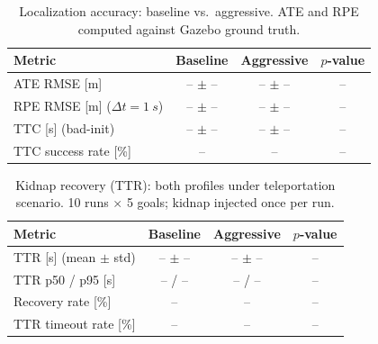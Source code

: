 \begin{table}[t]
\centering
\caption{Localization accuracy: baseline vs.\ aggressive.
ATE and RPE computed against Gazebo ground truth.}
\label{tab:localization}
\begin{tabular}{lccc}
\toprule
Metric & Baseline & Aggressive & $p$-value \\
\midrule
ATE RMSE [m]         & -- $\pm$ -- & -- $\pm$ -- & -- \\
RPE RMSE [m] ($\Delta t = \SI{1}{s}$) & -- $\pm$ -- & -- $\pm$ -- & -- \\
\midrule
TTC [s] (bad-init)   & -- $\pm$ -- & -- $\pm$ -- & -- \\
TTC success rate [\%] & --          & --          & -- \\
\bottomrule
\end{tabular}
\end{table}

\begin{table}[t]
\centering
\caption{Kidnap recovery (TTR): both profiles under teleportation scenario.
10 runs $\times$ 5 goals; kidnap injected once per run.}
\label{tab:kidnap}
\begin{tabular}{lccc}
\toprule
Metric & Baseline & Aggressive & $p$-value \\
\midrule
TTR [s] (mean $\pm$ std) & -- $\pm$ -- & -- $\pm$ -- & -- \\
TTR p50 / p95 [s]         & -- / --     & -- / --     & -- \\
Recovery rate [\%]         & --          & --          & -- \\
TTR timeout rate [\%]      & --          & --          & -- \\
\bottomrule
\end{tabular}
\end{table}
